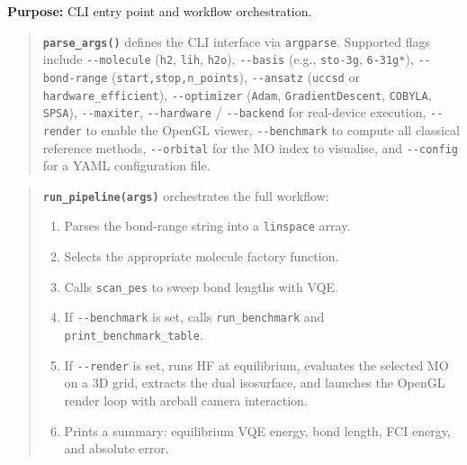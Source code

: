 \documentclass[
  11pt,
]{report}
\providecommand{\tightlist}{%
  \setlength{\itemsep}{0pt}\setlength{\parskip}{0pt}}
\begin{document}
\textbf{Purpose:} CLI entry point and workflow orchestration.

\begin{quote}
\textbf{\texttt{parse\_args()}} defines the CLI interface via
\texttt{argparse}. Supported flags include \texttt{-\/-molecule}
(\texttt{h2}, \texttt{lih}, \texttt{h2o}), \texttt{-\/-basis} (e.g.,
\texttt{sto-3g}, \texttt{6-31g*}), \texttt{-\/-bond-range}
(\texttt{start,stop,n\_points}), \texttt{-\/-ansatz} (\texttt{uccsd} or
\texttt{hardware\_efficient}), \texttt{-\/-optimizer} (\texttt{Adam},
\texttt{GradientDescent}, \texttt{COBYLA}, \texttt{SPSA}),
\texttt{-\/-maxiter}, \texttt{-\/-hardware} / \texttt{-\/-backend} for
real-device execution, \texttt{-\/-render} to enable the OpenGL viewer,
\texttt{-\/-benchmark} to compute all classical reference methods,
\texttt{-\/-orbital} for the MO index to visualise, and
\texttt{-\/-config} for a YAML configuration file.
\end{quote}

\begin{quote}
\textbf{\texttt{run\_pipeline(args)}} orchestrates the full workflow:

\begin{enumerate}
\def\labelenumi{\arabic{enumi}.}
\tightlist
\item
  Parses the bond-range string into a \texttt{linspace} array.
\item
  Selects the appropriate molecule factory function.
\item
  Calls \texttt{scan\_pes} to sweep bond lengths with VQE.
\item
  If \texttt{-\/-benchmark} is set, calls \texttt{run\_benchmark} and
  \texttt{print\_benchmark\_table}.
\item
  If \texttt{-\/-render} is set, runs HF at equilibrium, evaluates the
  selected MO on a 3D grid, extracts the dual isosurface, and launches
  the OpenGL render loop with arcball camera interaction.
\item
  Prints a summary: equilibrium VQE energy, bond length, FCI energy, and
  absolute error.
\end{enumerate}
\end{quote}
\end{document}
